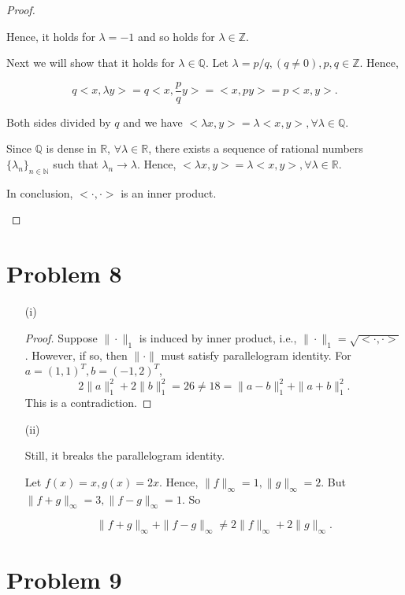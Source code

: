 \documentclass[12pt]{article}
\begin{document}
\begin{proof}
\begin{enumerate}
Hence, it holds for $\lambda = -1$ and so holds for $\lambda\in \mathbb Z$. 

Next we will show that it holds for $\lambda \in \mathbb Q$. Let $\lambda = p/q, (q\neq 0), p, q \in \mathbb Z$. Hence, 

$$
q<x, \lambda y> = q <x, \frac{p}{q}y> = <x, py> = p<x, y>.
$$ 

Both sides divided by $q$ and we have $<\lambda x, y> = \lambda<x, y>, \forall \lambda \in \mathbb Q$.

Since $\mathbb Q$ is dense in $\mathbb R$, $\forall \lambda\in\mathbb R$, there exists a sequence of rational numbers $\{\lambda_n\}_{n\in\mathbb N}$ such that $\lambda_n \rightarrow \lambda$. Hence, $<\lambda x, y> = \lambda<x, y>, \forall \lambda \in \mathbb R$.

In conclusion, $<\cdot, \cdot>$ is an inner product.

\end{enumerate}

\end{proof}

\section*{Problem 8}

\begin{enumerate}
\item [(i)]

\begin{proof}

Suppose $\|\cdot\|_1$ is induced by inner product, i.e., $\|\cdot\|_1 = \sqrt{<\cdot, \cdot>}$. However, if so, then $\|\cdot\|$ must satisfy parallelogram identity. For $a = (1,1)^T, b = (-1, 2)^T$, $$
2\|a\|_1^2 + 2\|b\|_1^2 = 26 \neq 18 = \|a - b\|_1^2 + \|a + b\|_1^2.
$$
This is a contradiction.

\end{proof}

\item [(ii)]

Still, it breaks the parallelogram identity.

Let $f(x) = x, g(x) = 2x$. Hence, $\|f\|_\infty = 1, \|g\|_\infty = 2$. But $\|f+g\|_\infty = 3, \|f-g\|_\infty = 1$. So 

$$
\|f+g\|_\infty + \|f-g\|_\infty \neq 2\|f\|_\infty + 2\|g\|_\infty.
$$

\end{enumerate}

\section*{Problem 9}
\end{document}
